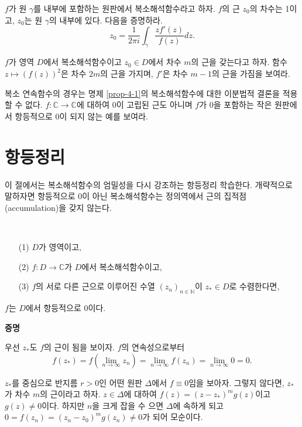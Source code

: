 \begin{salt_exercise} \label{ex-4-19}
$f$가 원 $\gamma$를 내부에 포함하는 원판에서 복소해석함수라고 하자.
$f$의 근 $z_0$의 차수는 1이고,
$z_0$는 원 $\gamma$의 내부에 있다.
다음을 증명하라.
\[
z_0 = \dfrac1{2\pi i} \int_\gamma \dfrac{zf'(z)}{f(z)} dz.
\]
\end{salt_exercise}

\begin{salt_exercise} \label{ex-4-20}
$f$가 영역 $D$에서 복소해석함수이고 $z_0\in D$에서
차수 $m$의 근을 갖는다고 하자.
함수 $z \mapsto (f(z))^2$은 차수 $2m$의 근을 가지며,
$f'$은 차수 $m-1$의 근을 가짐을 보여라.
\end{salt_exercise}

\begin{salt_exercise} \label{ex-4-21}
복소 연속함수의 경우는 명제 \ref{prop-4-1}의 복소해석함수에 대한
이분법적 결론을 적용할 수 없다. 
$f:\mathbb C \to \mathbb C$에 대하여 
$0$이  고립된 근도 아니며 $f$가 $0$을 포함하는 작은 원판에서  
항등적으로 $0$이 되지 않는 예를 보여라.
\end{salt_exercise}

\section{항등정리}

이 절에서는 복소해석함수의 엄밀성을 다시 강조하는 항등정리 학습한다.
개략적으로 말하자면
항등적으로 $0$이 아닌 복소해석함수는 정의역에서 근의 집적점(accumulation)을 갖지 않는다.

\begin{salt_theorem} \label{thm-4-5}
\
\begin{itemize}
\item[(1)] $D$가 영역이고,
\item[(2)] $f:D\to\mathbb C$가 $D$에서 복소해석함수이고,
\item[(3)] $f$의 서로 다른 근으로 이루어진 수열 $(z_n)_{n\in\mathbb N}$이 $z_*\in D$로 수렴한다면,
\end{itemize}
$f$는 $D$에서 항등적으로 $0$이다.
\end{salt_theorem}

{\bf 증명}

우선 $z_*$도 $f$의 근이 됨을 보이자.
$f$의 연속성으로부터
\[
f(z_*) = f\left(\lim_{n\to\infty} z_n \right) = \lim_{n\to\infty}f( z_n) 
= \lim_{n\to\infty} 0 = 0.
\]

$z_*$를 중심으로 반지름 $r>0$인 어떤 원판 $\Delta$에서 $f\equiv0$임을 보아자.
그렇지 않다면, $z_*$가 차수 $m$의 근이라고 하자.
$z\in \Delta$에 대하여
$f(z)=(z-z_*)^mg(z)$이고 $g(z)\ne0$이다.
하지만 $n$을 크게 잡을 수 으면 $\Delta$에 속하게 되고
$0 = f(z_n) = (z_n-z_0)^m g(z_n) \ne 0$가 되어 모순이다.

